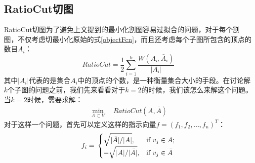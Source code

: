 \documentclass[UTF8, 12pt]{ctexart}
\begin{document}
\subsection{RatioCut切图}
RatioCut切图为了避免上文提到的最小化割图容易过拟合的问题，对于每个割图，不仅考虑切最小化原始的式\ref{objectFcn}，而且还考虑每个子图所包含的顶点的数目$A_{i}$：
\begin{equation}
RatioCut = \frac{1}{2}\sum\limits_{i = 1}^k {\frac{{W({A_i},{{\bar A}_i})}}{{|{A_i}|}}}
\end{equation}
其中$|{A_i}|$代表的是集合$A_{i}$中的顶点的个数，是一种衡量集合大小的手段。在讨论解$k$个子图的问题之前，我们先来看看对于$k=2$的时候，我们该怎么来解这个问题。当$k=2$时候，需要求解：
\begin{align}
	\min_{A \subset V} \quad RatioCut(A,\bar A)
\end{align}
对于这样一个问题，首先可以定义这样的指示向量$f = {({f_1},{f_2},...,{f_n})^T}$：
\begin{equation}
{f_{i}} = \\
\begin{cases}
	\sqrt {|\bar A|/|A|}, & \text{if } {v_j} \in A; \\
	- \sqrt {|A|/|\bar A|} , & \text{if } {v_j} \in \bar A
\end{cases}
\label{ratioCutIndictorFcn}
\end{equation}
\end{document}

